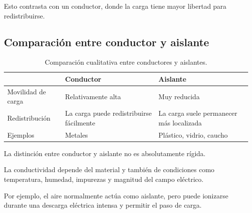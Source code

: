 Esto contrasta con un conductor, donde la carga tiene mayor libertad para
redistribuirse.



\subsection{Comparación entre conductor y aislante}

\begin{table}[H]
    \centering

    \caption{Comparación cualitativa entre conductores y aislantes.}

    \begin{tabularx}{\textwidth}{lYY}
        \toprule
        & \textbf{Conductor} & \textbf{Aislante} \\
        \midrule

        Movilidad de carga
        &
        Relativamente alta
        &
        Muy reducida
        \\

        Redistribución
        &
        La carga puede redistribuirse fácilmente
        &
        La carga suele permanecer más localizada
        \\

        Ejemplos
        &
        Metales
        &
        Plástico, vidrio, caucho
        \\

        \bottomrule
    \end{tabularx}

\end{table}

\begin{advertencia}
La distinción entre conductor y aislante no es absolutamente rígida.

La conductividad depende del material y también de condiciones como
temperatura, humedad, impurezas y magnitud del campo eléctrico.

Por ejemplo, el aire normalmente actúa como aislante, pero puede ionizarse
durante una descarga eléctrica intensa y permitir el paso de carga.
\end{advertencia}



